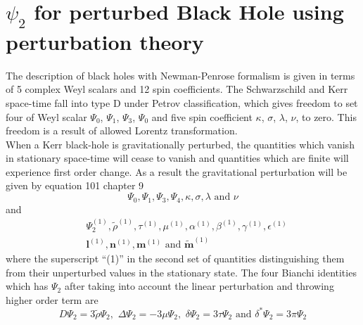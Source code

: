 \documentclass[prd,preprintnumbers,onecolumn,eqsecnum,floatfix,letter]{revtex4}
\begin{document}
\section{$\psi_{2}$ for perturbed Black Hole using perturbation theory}
The description of black holes with Newman-Penrose formalism is given in terms of 5 complex Weyl scalars and 12 spin coefficients. The Schwarzschild and Kerr space-time fall into type D under Petrov classification, which gives freedom to set four of Weyl scalar $\Psi_0$, $\Psi_1$, $\Psi_3$, $\Psi_0$ and five spin coefficient $\kappa$, $\sigma$, $\lambda$, $\nu$,  to zero. This freedom is a result of allowed Lorentz transformation. \\
When a Kerr black-hole is gravitationally perturbed, the quantities which vanish in stationary space-time will cease to vanish and quantities which are finite will experience first order change. As a result the gravitational perturbation will be given by equation 101 chapter 9 \cite{Chandrasekhar:579245}      
\begin{equation}
	\Psi_0, \Psi_1, \Psi_3, \Psi_4, \kappa, \sigma, \lambda \, \, \text{and} \, \,\nu
\end{equation}
and 
\begin{align}
	&\Psi_{2}^{\left(1\right)}, \tilde{\rho}^{\left(1\right)}, \tau^{\left(1\right)}, \mu^{\left(1\right)}, \alpha^{\left(1\right)}, \beta^{\left(1\right)}, \gamma^{\left(1\right)}, \epsilon^{\left(1\right)} \nonumber \\
	&\boldsymbol{l}^{\left(1\right)}, \boldsymbol{n}^{\left(1\right)}, \boldsymbol{m}^{\left(1\right)} \,\, \text{and} \,\, \boldsymbol{\tilde{m}}^{\left(1\right)}
\end{align}
where the superscript ``(1)'' in the second set of quantities distinguishing them from their unperturbed values in the stationary state. The four Bianchi identities which has $\Psi_{2}$ after taking into account the linear perturbation and throwing higher order term are 
\begin{equation}
	D\Psi_{2} = 3\tilde{\rho}\Psi_{2}, \,\, \Delta\Psi_{2} = -3\mu\Psi_{2},  \,\, \delta\Psi_{2} = 3\tau\Psi_{2} \,\, \text{and} \,\, \delta^{*}\Psi_{2} = 3\pi\Psi_{2}
\end{equation}  
\end{document}
